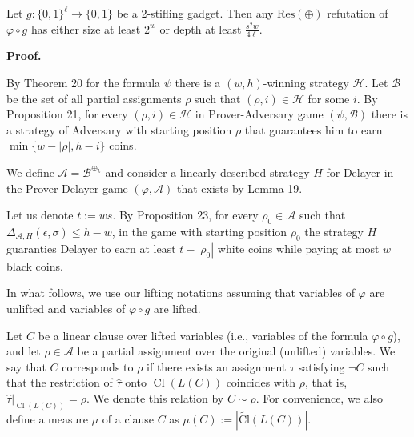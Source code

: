 Let $g\colon\{0,1\}^{\ell}\to\{0,1\}$ be a 2-stifling gadget.
Then any $\mathrm{Res}(\oplus)$ refutation of $\varphi\circ g$ has either size at least $2^{w}$ or depth at least
$\frac{s^{2}w}{4\ell}$.\par



\par\medskip\noindent\textbf{Proof.}\par


By Theorem 20 for the formula $\psi$ there is a $(w,h)$-winning strategy $\mathcal{H}$.
Let $\mathcal{B}$ be the set of all partial assignments $\rho$ such that $(\rho,i)\in\mathcal{H}$ for some $i$.
By Proposition 21, for every $(\rho,i)\in\mathcal{H}$ in Prover-Adversary game
$(\psi,\mathcal{B})$ there is a strategy of Adversary with starting position $\rho$ that guarantees him to earn
$\min\{w-|\rho|,h-i\}$ coins.\par



We define $\mathcal{A}=\mathcal{B}^{\oplus_{k}}$ and consider a linearly described strategy $H$ for Delayer in the
Prover-Delayer game $(\varphi,\mathcal{A})$ that exists by Lemma 19.\par



Let us denote $t:=ws$.
By Proposition 23, for every $\rho_{0}\in\mathcal{A}$ such that $\Delta_{\mathcal{A},H}(\epsilon,\sigma)\leq h-w$,
in the game with starting position $\rho_{0}$ the strategy $H$ guaranties Delayer to earn at least $t-|\rho_{0}|$ white coins
while paying at most $w$ black coins.\par



In what follows, we use our lifting notations assuming that variables of $\varphi$ are unlifted and variables of $\varphi\circ g$ are lifted.\par



Let $C$ be a linear clause over lifted variables (i.e., variables of the formula $\varphi\circ g$),
and let $\rho\in\mathcal{A}$ be a partial assignment over the original (unlifted) variables.
We say that $C$ corresponds to $\rho$ if there exists an assignment $\tau$ satisfying $\lnot C$ such that
the restriction of $\hat{\tau}$ onto $\operatorname{Cl}(L(C))$ coincides with $\rho$, that is, $\hat{\tau}|_{\operatorname{Cl}(L(C))}=\rho$.
We denote this relation by $C\sim\rho$.
For convenience, we also define a measure $\mu$ of a clause $C$ as
$\mu(C):=\left|\operatorname{\widetilde{Cl}}(L(C))\right|$.\par



